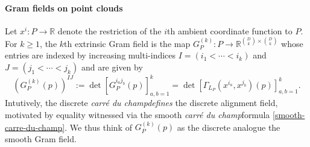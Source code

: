 \documentclass{article}
\newcommand{\R}{\mathbb{R}}
\newcommand{\cdc}{\textit{carré du champ}}
\theoremstyle{remark}
\theoremstyle{plain}
\begin{document}
\paragraph{Gram fields on point clouds} Let $x^i : P \to \mathbb{R}$ denote the restriction of the $i$th ambient
coordinate function to $P$. For $k\geq 1$, the $k$th extrinsic Gram field is the map $
G_P^{(k)} : P \to \R^{\binom{D}{k}\times \binom{D}{k}}$
whose entries are indexed by increasing multi-indices
$I=(i_1<\cdots<i_k)$ and $J=(j_1<\cdots<j_k)$ and are given by
\begin{equation}
\left(G_P^{(k)}(p)\right)^{IJ}
:=
\det
\left[
G_P^{i_a j_b}(p)
\right]_{a,b=1}^k
=
\det
\left[
\Gamma_{L_P}(x^{i_a},x^{j_b})(p)
\right]_{a,b=1}^k .
\end{equation}
Intutively, the discrete \cdc \textit{defines} the discrete alignment field, motivated by equality witnessed via the smooth \cdc formula \ref{smooth-carre-du-champ}. We thus think of $G_P^{(k)}(p)$ as the discrete analogue the smooth Gram field.

\end{document}
